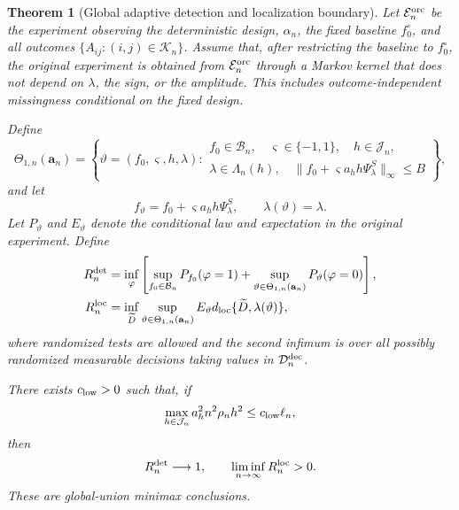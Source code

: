 \documentclass[11pt]{article}
\newtheorem{theorem}{Theorem}[section]
\theoremstyle{definition}
\newcommand{\1}{\mathbf 1}\newcommand{\op}{\operatorname}
\begin{document}
\begin{theorem}[Global adaptive detection and localization boundary]
Let \(\mathcal E_n^{\rm orc}\) be the experiment observing the
deterministic design, \(\alpha_n\), the fixed baseline
\(f_0^\circ\), and all outcomes
\(\{A_{ij}:(i,j)\in\mathcal K_n\}\).  Assume that, after restricting
the baseline to \(f_0^\circ\), the original experiment is obtained
from \(\mathcal E_n^{\rm orc}\) through a Markov kernel that does not
depend on \(\lambda\), the sign, or the amplitude.  This includes
outcome-independent missingness conditional on the fixed design.

Define
\[
\Theta_{1,n}(\mathbf a_n)
=
\left\{
\vartheta=(f_0,\varsigma,h,\lambda):
\begin{array}{l}
f_0\in\mathcal B_n,\quad
\varsigma\in\{-1,1\},\quad
h\in\mathcal J_n,\\
\lambda\in\Lambda_n(h),\quad
\|f_0+\varsigma a_h h\Psi_\lambda^S\|_\infty\le B
\end{array}
\right\},
\]
and let
\[
f_\vartheta
=
f_0+\varsigma a_h h\Psi_\lambda^S,
\qquad
\lambda(\vartheta)=\lambda.
\]
Let \(P_\vartheta\) and \(E_\vartheta\) denote the conditional law and
expectation in the original experiment.  Define
\begin{align}
R_n^{\rm det}
&=
\inf_\varphi
\left[
\sup_{f_0\in\mathcal B_n}P_{f_0}(\varphi=1)
+
\sup_{\vartheta\in\Theta_{1,n}(\mathbf a_n)}
P_\vartheta(\varphi=0)
\right],
\label{eq:t3-24}\\
R_n^{\rm loc}
&=
\inf_{\widetilde D}
\sup_{\vartheta\in\Theta_{1,n}(\mathbf a_n)}
E_\vartheta
d_{\rm loc}\{\widetilde D,\lambda(\vartheta)\},
\label{eq:t3-25}
\end{align}
where randomized tests are allowed and the second infimum is over
all possibly randomized measurable decisions taking values in
\(\mathcal D_n^{\rm dec}\).

There exists \(c_{\rm low}>0\) such that, if
\begin{equation}
\max_{h\in\mathcal J_n}
a_h^2n^2\rho_nh^2
\le
c_{\rm low}\ell_n,
\label{eq:t3-26}
\end{equation}
then
\begin{equation}
R_n^{\rm det}\longrightarrow1,
\qquad
\liminf_{n\to\infty}R_n^{\rm loc}>0.
\label{eq:t3-27}
\end{equation}
These are global-union minimax conclusions.
\end{theorem}
\end{document}
